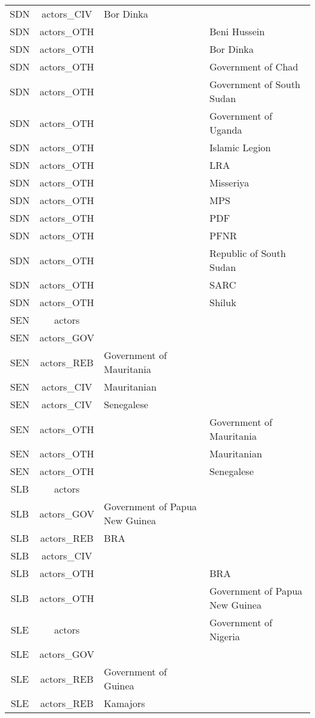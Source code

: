 \documentclass[12pt]{article}
\begin{document}
\begin{center}
\begin{longtable}{|c|c|p{7cm}|p{7cm}|}
  SDN & actors\_CIV & Bor Dinka &  \\ 
  SDN & actors\_OTH &  & Beni Hussein \\ 
  SDN & actors\_OTH &  & Bor Dinka \\ 
  SDN & actors\_OTH &  & Government of Chad \\ 
  SDN & actors\_OTH &  & Government of South Sudan \\ 
  SDN & actors\_OTH &  & Government of Uganda \\ 
  SDN & actors\_OTH &  & Islamic Legion \\ 
  SDN & actors\_OTH &  & LRA \\ 
  SDN & actors\_OTH &  & Misseriya \\ 
  SDN & actors\_OTH &  & MPS \\ 
  SDN & actors\_OTH &  & PDF \\ 
  SDN & actors\_OTH &  & PFNR \\ 
  SDN & actors\_OTH &  & Republic of South Sudan \\ 
  SDN & actors\_OTH &  & SARC \\ 
  SDN & actors\_OTH &  & Shiluk \\ 
  SEN & actors &  &  \\ 
  SEN & actors\_GOV &  &  \\ 
  SEN & actors\_REB & Government of Mauritania &  \\ 
  SEN & actors\_CIV & Mauritanian &  \\ 
  SEN & actors\_CIV & Senegalese &  \\ 
  SEN & actors\_OTH &  & Government of Mauritania \\ 
  SEN & actors\_OTH &  & Mauritanian \\ 
  SEN & actors\_OTH &  & Senegalese \\ 
  SLB & actors &  &  \\ 
  SLB & actors\_GOV & Government of Papua New Guinea &  \\ 
  SLB & actors\_REB & BRA &  \\ 
  SLB & actors\_CIV &  &  \\ 
  SLB & actors\_OTH &  & BRA \\ 
  SLB & actors\_OTH &  & Government of Papua New Guinea \\ 
  SLE & actors &  & Government of Nigeria \\ 
  SLE & actors\_GOV &  &  \\ 
  SLE & actors\_REB & Government of Guinea &  \\ 
  SLE & actors\_REB & Kamajors &  \\ 

\end{longtable}
\end{center}
\end{document}
